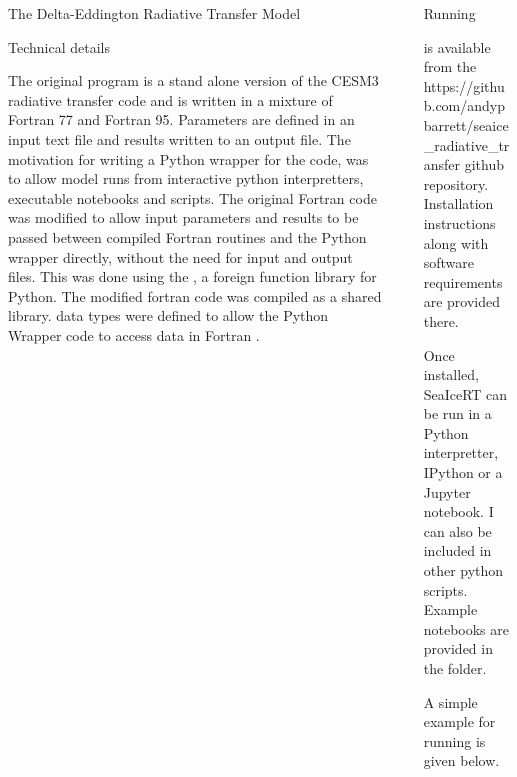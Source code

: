 \documentclass[final]{beamer}
\newlength{\sepwidth}
\newlength{\colwidth}
\newcommand{\separatorcolumn}{\begin{column}{\sepwidth}\end{column}}
\begin{document}
\begin{frame}[t,fragile]
\begin{columns}[t]
\begin{column}{\colwidth}
\begin{block}{The Delta-Eddington Radiative Transfer Model}
  \end{block}

  \begin{exampleblock}{Technical details}

    The original program  is a stand alone version of
    the CESM3 radiative transfer code and is written in a mixture of
    Fortran 77 and Fortran 95.  Parameters are defined in an input
    text file and results written to an output file.  The motivation
    for writing a Python wrapper for the code, was to allow model runs
    from interactive python interpretters, executable notebooks and
    scripts.  The original Fortran code was modified to allow input
    parameters and results to be passed between compiled Fortran
    routines and the Python wrapper directly, without the need for
    input and output files.  This was done using the , a
    foreign function library for Python.  The modified fortran code
    was compiled as a shared library.   data types were
    defined to allow the Python Wrapper code to access data in Fortran
    .

   
  \end{exampleblock}

\end{column}

\separatorcolumn

\begin{column}{\colwidth}

  \begin{exampleblock}{Running }

     is available from the https://github.com/andypbarrett/seaice\_radiative\_transfer github repository.
    Installation instructions along with software requirements are provided there.

    Once installed, SeaIceRT can be run in a Python interpretter, IPython or
    a Jupyter notebook.  I can also be included in other python scripts.  Example
    notebooks are provided in the  folder.

    A simple  example for running  is given below.
    
    \vspace{10mm}
    
\end{exampleblock}
\end{column}
\end{columns}
\end{frame}
\end{document}
